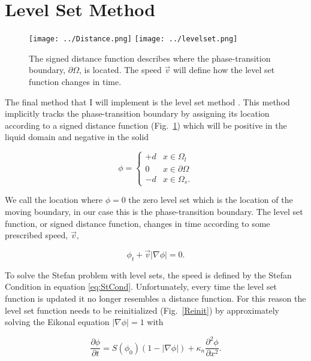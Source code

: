 \documentclass[12pt]{article}
\begin{document}
\section{Level Set Method}

\begin{figure}[]
\centering
{}
  \texttt{[image: ../Distance.png]}
\endminipage
{}
  \texttt{[image: ../levelset.png]}
\endminipage
\caption{The signed distance function describes where the phase-transition boundary, $\partial \Omega$, is located. The speed $\vec{v}$ will define how the level set function changes in time.}
\label{Sign}
\end{figure}

The final method that I will implement is the level set method \citep{Sethian1992}. This method implicitly tracks the phase-transition boundary by assigning its location according to a signed distance function (Fig.~\ref{Sign}) which will be positive in the liquid domain and negative in the solid

\begin{equation}
\phi = 
\begin{cases}
+d & x \in \Omega_l \\
0 & x \in \partial \Omega \\
-d & x \in \Omega_s.
\end{cases}
\end{equation}

We call the location where $\phi=0$ the zero level set which is the location of the moving boundary, in our case this is the phase-transition boundary. The level set function, or signed distance function, changes in time according to some prescribed speed, $\vec{v}$,

\begin{equation}
\phi_t + \vec{v}|\nabla \phi| = 0.
\end{equation}

To solve the Stefan problem with level sets, the speed is defined by the Stefan Condition in equation \ref{eq:StCond}. Unfortunately, every time the level set function is updated it no longer resembles a distance function. For this reason the level set function needs to be reinitialized (Fig.~\ref{Reinit}) by approximately solving the Eikonal equation $|\nabla \phi| = 1$ with 

\begin{equation}
\frac{\partial \phi}{\partial t} = S(\phi_0)(1-|\nabla \phi|) + \kappa_n \frac{\partial^2 \phi}{\partial x^2}.
\end{equation}
\end{document}
